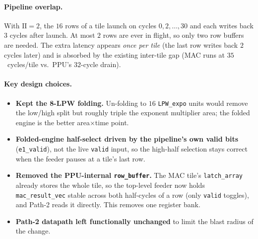 \documentclass[11pt]{article}
\begin{document}
\paragraph{Pipeline overlap.} With $\text{II}=2$, the $16$ rows of a tile launch
on cycles $0,2,\dots,30$ and each writes back $3$ cycles after launch. At most
$2$ rows are ever in flight, so only two row buffers are needed. The extra
latency appears \emph{once per tile} (the last row writes back $2$ cycles later)
and is absorbed by the existing inter-tile gap (MAC runs at $35$~cycles/tile vs.\
PPU's $32$-cycle drain).

\begin{center}
\end{center}

\paragraph{Key design choices.}
\begin{itemize}
  \item \textbf{Kept the 8-LPW folding.} Un-folding to $16$ \texttt{LPW\_expo}
        units would remove the low/high split but roughly triple the exponent
        multiplier area; the folded engine is the better area$\times$time point.
  \item \textbf{Folded-engine half-select driven by the pipeline's own valid
        bits} (\texttt{e1\_valid}), not the live \texttt{valid} input, so the
        high-half selection stays correct when the feeder pauses at a tile's
        last row.
  \item \textbf{Removed the PPU-internal \texttt{row\_buffer}.} The MAC tile's
        \texttt{latch\_array} already stores the whole tile, so the top-level
        feeder now holds \texttt{mac\_result\_vec} stable across both half-cycles
        of a row (only \texttt{valid} toggles), and Path-2 reads it directly.
        This removes one register bank.
  \item \textbf{Path-2 datapath left functionally unchanged} to limit the blast
        radius of the change.
\end{itemize}
\end{document}
